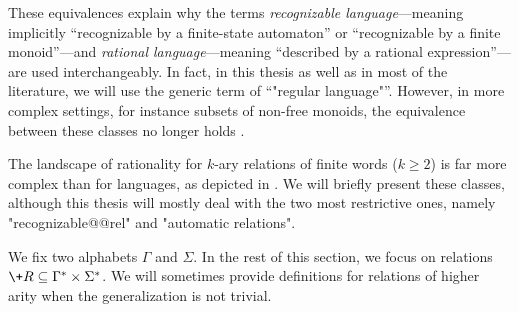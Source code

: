 These equivalences explain why the terms \emph{recognizable language}---meaning implicitly
``recognizable by a finite-state automaton'' or ``recognizable by a finite monoid''---and
\emph{rational language}---meaning ``described by a rational expression''---are used 
interchangeably. In fact, in this thesis as well as in most of the literature,
we will use the generic term of ``"regular language"''.
However, in more complex settings, for instance subsets of non-free monoids,%
the equivalence between these classes no longer holds \cite{Pin2021StackExchange}.

The landscape of rationality for $k$-ary relations of finite words ($k \geq 2$) is far more complex than for languages,%
 as depicted in . We will briefly present these classes,
although this thesis will mostly deal with the two most restrictive ones, namely
"recognizable@@rel" and "automatic relations".%

We fix two alphabets $\Gamma$ and $\Sigma$. In the rest of this section, we focus
on relations $\+R \subseteq \Gamma^* \times \Sigma^*$. We will sometimes provide definitions
for relations of higher arity when the generalization is not trivial.

